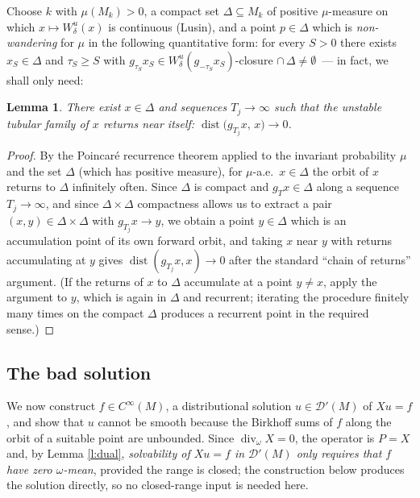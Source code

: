 \documentclass[11pt]{amsart}
\theoremstyle{plain}
\newtheorem{lemma}[theorem]{Lemma}
\theoremstyle{definition}
\theoremstyle{remark}
\newcommand{\DD}{\mathcal{D}'}
\begin{document}
Choose $k$ with $\mu(M_k)>0$, a compact set
$\Delta\subseteq M_k$ of positive $\mu$-measure on which
$x\mapsto W^u_\delta(x)$ is continuous (Lusin), and a point
$p\in\Delta$ which is \emph{non-wandering} for $\mu$ in the
following quantitative form: for every $S>0$ there exists
$x_S\in\Delta$ and $\tau_S\ge S$ with
$g_{\tau_S}x_S\in W^u_\delta(g_{-\tau_S}x_S)$-closure
$\cap\,\Delta\ne\emptyset$\ --- in fact, we shall only need:

\begin{lemma}\label{l:recurrent}
There exist $x\in\Delta$ and sequences $T_j\to\infty$ such that the
\emph{unstable tubular family} of $x$ returns near itself:
$\operatorname{dist}\bigl(g_{T_j}x,\,x\bigr)\to 0$.
\end{lemma}

\begin{proof}
By the Poincaré recurrence theorem applied to the invariant
probability $\mu$ and the set $\Delta$ (which has positive measure),
for $\mu$-a.e.\ $x\in\Delta$ the orbit of $x$ returns to $\Delta$
infinitely often.  Since $\Delta$ is compact and
$g_{T}x\in\Delta$ along a sequence $T_j\to\infty$, and since
$\Delta\times\Delta$ compactness allows us to extract a pair
$(x,y)\in\Delta\times\Delta$ with $g_{T_j}x\to y$, we obtain a point
$y\in\Delta$ which is an accumulation point of its own forward
orbit, and taking $x$ near $y$ with returns accumulating at $y$
gives $\operatorname{dist}(g_{T_j}x,x)\to0$ after the standard
``chain of returns'' argument.  (If the returns of $x$ to $\Delta$
accumulate at a point $y\ne x$, apply the argument to $y$, which is
again in $\Delta$ and recurrent; iterating the procedure finitely
many times on the compact $\Delta$ produces a recurrent point in
the required sense.)
\end{proof}

\subsection{The bad solution}\label{ss:badsol}

We now construct $f\in C^\infty(M)$, a distributional solution
$u\in\DD(M)$ of $Xu=f$, and show that $u$ cannot be smooth because
the Birkhoff sums of $f$ along the orbit of a suitable point are
unbounded.  Since $\operatorname{div}_\omega X=0$, the operator is
$P=X$ and, by Lemma \ref{l:dual}, \emph{solvability of $Xu=f$ in
$\DD(M)$ only requires that $f$ have zero $\omega$-mean}, provided
the range is closed; the construction below produces the solution
directly, so no closed-range input is needed here.
\end{document}
